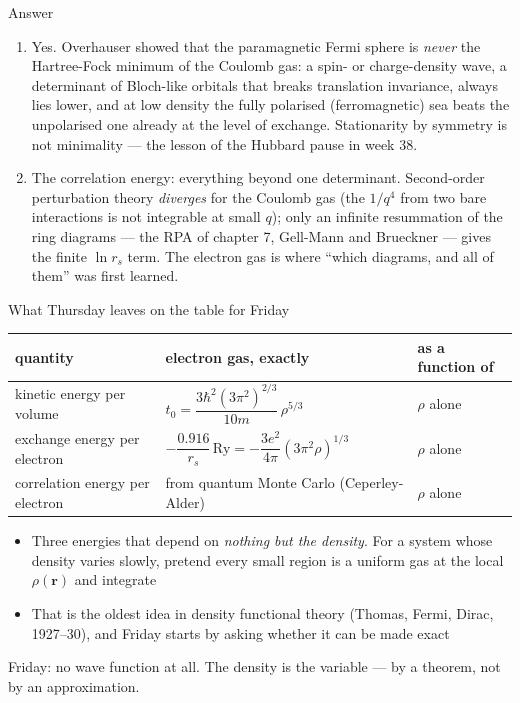 \documentclass[aspectratio=169,10pt]{beamer}
\newcounter{thinkctr}
\newcommand{\thinka}[1]{%
  \vfill
  \begin{tcolorbox}[enhanced,colback=paleteal,colframe=teal,boxrule=1.2pt,arc=4pt,
    grow to left by=6mm,grow to right by=6mm,
    left=16pt,right=16pt,top=16pt,bottom=18pt,
    fonttitle=\bfseries\Large,fontupper=\large,
    title={Answer to pause \#\thethinkctr}]
  #1
  \end{tcolorbox}
  \vfill}
\begin{document}
\begin{frame}{Answer}
  \thinka{
  \begin{enumerate}
    \item Yes. Overhauser showed that the paramagnetic Fermi sphere is \emph{never} the Hartree-Fock minimum of the Coulomb gas: a spin- or charge-density wave, a determinant of Bloch-like orbitals that breaks translation invariance, always lies lower, and at low density the fully polarised (ferromagnetic) sea beats the unpolarised one already at the level of exchange. Stationarity by symmetry is not minimality --- the lesson of the Hubbard pause in week 38.
    \item The correlation energy: everything beyond one determinant. Second-order perturbation theory \emph{diverges} for the Coulomb gas (the $1/q^4$ from two bare interactions is not integrable at small $q$); only an infinite resummation of the ring diagrams --- the RPA of chapter 7, Gell-Mann and Brueckner --- gives the finite $\ln r_s$ term. The electron gas is where ``which diagrams, and all of them'' was first learned.
  \end{enumerate}}
\end{frame}

\begin{frame}{What Thursday leaves on the table for Friday}
  \begin{center}\small
  \begin{tabular}{@{}lll@{}}\toprule
  quantity & electron gas, exactly & as a function of\\\midrule
  kinetic energy per volume & $t_0=\dfrac{3\hbar^2(3\pi^2)^{2/3}}{10m}\,\rho^{5/3}$ & $\rho$ alone\\[8pt]
  exchange energy per electron & $-\dfrac{0.916}{r_s}\,\mathrm{Ry}=-\dfrac{3e^2}{4\pi}(3\pi^2\rho)^{1/3}$ & $\rho$ alone\\[8pt]
  correlation energy per electron & from quantum Monte Carlo (Ceperley-Alder) & $\rho$ alone\\\bottomrule
  \end{tabular}
  \end{center}
  \vspace{0.4em}
  \begin{itemize}
    \item Three energies that depend on \emph{nothing but the density}. For a system whose density varies slowly, pretend every small region is a uniform gas at the local $\rho(\bm r)$ and integrate
    \item That is the oldest idea in density functional theory (Thomas, Fermi, Dirac, 1927--30), and Friday starts by asking whether it can be made exact
  \end{itemize}
  \vspace{0.3em}
  \centering\alert{Friday: no wave function at all. The density is the variable --- by a theorem, not by an approximation.}
\end{frame}
\end{document}
